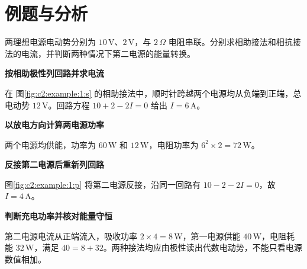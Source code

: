 \section{例题与分析}

\begin{question}\begin{example}[两电源相助与相抗]\label{c2:example:1}
两理想电源电动势分别为 $10\,\mathrm V$、$2\,\mathrm V$，与 $2\,\Omega$ 电阻串联。分别求相助接法和相抗接法的电流，并判断两种情况下第二电源的能量转换。
\end{example}
\end{question}
\begin{solution}\textbf{按相助极性列回路并求电流}\par\nobreak
在 图\ref{fig:c2:example:1:s} 的相助接法中，顺时针跨越两个电源均从负端到正端，总电动势 $12\,\mathrm V$。回路方程 $10+2-2I=0$ 给出 $I=6\,\mathrm A$。

\par\medskip{}\noindent\textbf{以放电方向计算两电源功率}\par\nobreak
两个电源均供能，功率为 $60\,\mathrm W$ 和 $12\,\mathrm W$，电阻功率为 $6^2\times2=72\,\mathrm W$。



\par\medskip{}\noindent\textbf{反接第二电源后重新列回路}\par\nobreak
图\ref{fig:c2:example:1:p} 将第二电源反接，沿同一回路有 $10-2-2I=0$，故 $I=4\,\mathrm A$。

\par\medskip{}\noindent\textbf{判断充电功率并核对能量守恒}\par\nobreak
第二电源电流从正端流入，吸收功率 $2\times4=8\,\mathrm W$，第一电源供能 $40\,\mathrm W$，电阻耗能 $32\,\mathrm W$，满足 $40=8+32$。两种接法均应由极性读出代数电动势，不能只看电源数值相加。\end{solution}
